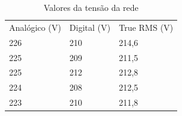 \documentclass[14pt, oneside]{book}
\theoremstyle{definition}
\begin{document}
                \begin{table}[H]
                    \centering
                    {\renewcommand\arraystretch{1.25}
                    \caption{Valores da tensão da rede}
                    \label{rede}
                    \begin{tabular}{ l l l }
                        \cline{1-1}\cline{2-2}\cline{3-3}  
                            \multicolumn{1}{|p{3.033cm}|}{Analógico (V) \centering } &
                            \multicolumn{1}{p{2.267cm}|}{Digital (V) \centering } &
                            \multicolumn{1}{p{4.217cm}|}{True RMS (V) \centering }
                      \\  
                        \cline{1-1}\cline{2-2}\cline{3-3}  
                            \multicolumn{1}{|p{3.033cm}|}{226 \centering } &
                            \multicolumn{1}{p{2.267cm}|}{210 \centering } &
                            \multicolumn{1}{p{4.217cm}|}{214,6 \centering }
                      \\  
                        \cline{1-1}\cline{2-2}\cline{3-3}  
                            \multicolumn{1}{|p{3.033cm}|}{225 \centering } &
                            \multicolumn{1}{p{2.267cm}|}{209 \centering } &
                            \multicolumn{1}{p{4.217cm}|}{211,5 \centering }
                      \\  
                        \cline{1-1}\cline{2-2}\cline{3-3}  
                            \multicolumn{1}{|p{3.033cm}|}{225 \centering } &
                            \multicolumn{1}{p{2.267cm}|}{212 \centering } &
                            \multicolumn{1}{p{4.217cm}|}{212,8 \centering }
                      \\  
                        \cline{1-1}\cline{2-2}\cline{3-3}  
                            \multicolumn{1}{|p{3.033cm}|}{224 \centering } &
                            \multicolumn{1}{p{2.267cm}|}{208 \centering } &
                            \multicolumn{1}{p{4.217cm}|}{212,5 \centering }
                      \\  
                        \cline{1-1}\cline{2-2}\cline{3-3}  
                            \multicolumn{1}{|p{3.033cm}|}{223 \centering } &
                            \multicolumn{1}{p{2.267cm}|}{210 \centering } &
                            \multicolumn{1}{p{4.217cm}|}{211,8 \centering }
                      \\  
                        \cline{1-1}\cline{2-2}\cline{3-3}  

\end{tabular}}
\end{table}
\end{document}
